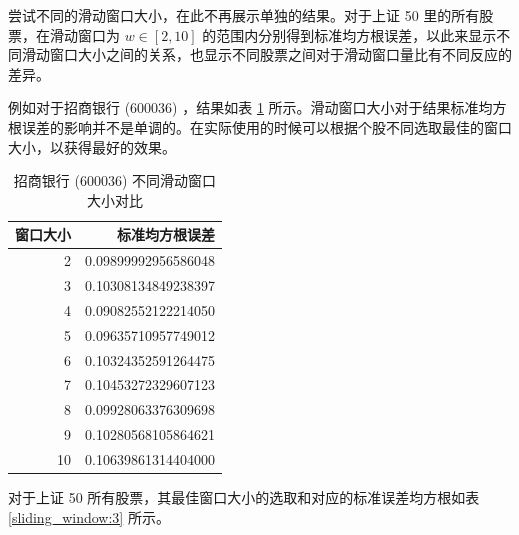尝试不同的滑动窗口大小，在此不再展示单独的结果。对于上证 50 里的所有股票，在滑动窗口为 $w\in [2, 10]$ 的范围内分别得到标准均方根误差，以此来显示不同滑动窗口大小之间的关系，也显示不同股票之间对于滑动窗口量比有不同反应的差异。

例如对于招商银行 (600036) ，结果如表 \ref{sliding_window:2} 所示。滑动窗口大小对于结果标准均方根误差的影响并不是单调的。在实际使用的时候可以根据个股不同选取最佳的窗口大小，以获得最好的效果。

\begin{table}
  \centering
  \caption{招商银行 (600036) 不同滑动窗口大小对比}
  \label{sliding_window:2}
  \begin{tabular}{rr}
    \toprule
    窗口大小 & 标准均方根误差 \\
    \midrule
    2 & 0.09899992956586048 \\
    3 & 0.10308134849238397 \\
    4 & 0.09082552122214050 \\
    5 & 0.09635710957749012 \\
    6 & 0.10324352591264475 \\
    7 & 0.10453272329607123 \\
    8 & 0.09928063376309698 \\
    9 & 0.10280568105864621 \\
    10 & 0.10639861314404000 \\
    \bottomrule
  \end{tabular}
\end{table}

对于上证 50 所有股票，其最佳窗口大小的选取和对应的标准误差均方根如表 \ref{sliding_window:3} 所示。

